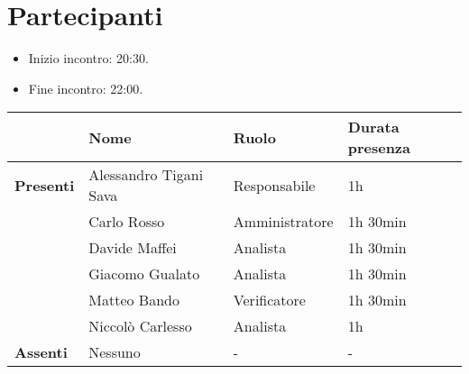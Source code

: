 \section*{Partecipanti}

\begin{itemize}
	\item Inizio incontro: 20:30.
	\item Fine incontro: 22:00.
\end{itemize}


\begin{center}
	{\renewcommand{\arraystretch}{1.5}
		\begin{tabular}{llll}
			                  & \textbf{Nome}          & \textbf{Ruolo} & \textbf{Durata presenza} \\
			\hline
			\textbf{Presenti} & Alessandro Tigani Sava & Responsabile   & 1h                       \\
			                  & Carlo Rosso            & Amministratore & 1h 30min                 \\
			                  & Davide Maffei          & Analista       & 1h 30min                 \\
			                  & Giacomo Gualato        & Analista       & 1h 30min                 \\
			                  & Matteo Bando           & Verificatore   & 1h 30min                 \\
			                  & Niccolò Carlesso       & Analista       & 1h                       \\
			\hline
			\textbf{Assenti}  & Nessuno                & -              & -
		\end{tabular}
	}
	\label{tab:partecipanti}
\end{center}
